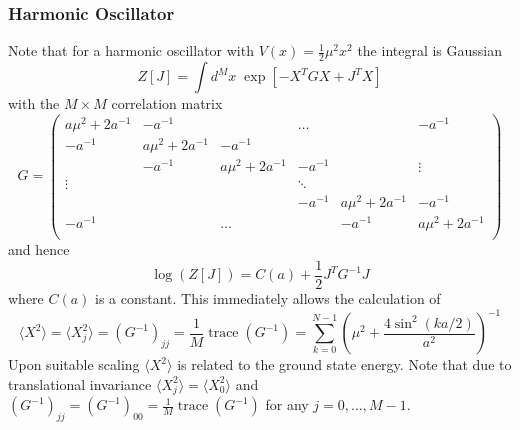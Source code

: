 \documentclass[11pt]{article}
\renewcommand{\vec}[1]{{#1}}
\begin{document}
\subsubsection{Harmonic Oscillator}
Note that for a harmonic oscillator with $V(x) = \frac{1}{2}\mu^2 x^2$ the integral is Gaussian
\begin{equation}
  Z[\vec{J}] = \int d^M\vec{x}\;\exp\left[-\vec{X}^T G \vec{X} + \vec{J}^T \vec{X}\right]
  \end{equation}
with the $M\times M$ correlation matrix
\begin{equation}
  G = \begin{pmatrix}
    a\mu^2 + 2a^{-1} & -a^{-1} & & \dots & & -a^{-1}\\
    -a^{-1} & a\mu^2 + 2a^{-1} & -a^{-1} & &\\
    & -a^{-1} & a\mu^2 + 2a^{-1} & -a^{-1} & & \vdots\\
    \vdots & & & \ddots\\
    & & & -a^{-1} & a\mu^2 + 2a^{-1} & -a^{-1}\\
        -a^{-1} & & \dots & & -a^{-1} & a\mu^2 + 2a^{-1}\\
  \end{pmatrix}
\end{equation}
and hence
\begin{equation}
  \log\left(Z[\vec{J}]\right) = C(a) + \frac{1}{2}\vec{J}^T G^{-1} \vec{J}
\end{equation}
where $C(a)$ is a constant.
This immediately allows the calculation of
\begin{equation}
  \langle X^2\rangle = \langle X_j^2 \rangle = \left(G^{-1}\right)_{jj} = \frac{1}{M}\operatorname{trace}\left(G^{-1}\right) = \sum_{k=0}^{N-1} \left(\mu^2 + \frac{4\sin^2(ka/2)}{a^2}\right)^{-1}
\end{equation}
Upon suitable scaling $\langle X^2\rangle$ is related to the ground state energy. Note that due to translational invariance $\langle X_j^2\rangle =\langle X_0^2\rangle$ and $\left(G^{-1}\right)_{jj}=\left(G^{-1}\right)_{00}=\frac{1}{M}\operatorname{trace}\left(G^{-1}\right)$ for any $j=0,\dots,M-1$.
\end{document}
